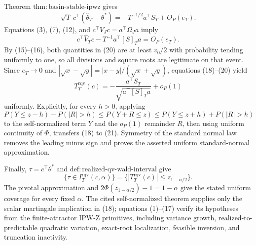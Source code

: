 Theorem \(\mathrm{thm:basin\text{-}stable\text{-}ipwz}\) gives
\[
 \sqrt T\,c^\top(\widehat\theta_T-\theta^*)
 =-T^{-1/2}a^\top S_T+O_P(e_T).
\tag{19}
\]
Equations (3), (7), (12), and \(c^\top V_Jc=a^\top\Omega_Ja\) imply
\[
 c^\top\widehat V_Tc-T^{-1}a^\top[S]_Ta=O_P(e_T).
\tag{20}
\]
By (15)--(16), both quantities in (20) are at least \(v_0/2\) with probability tending uniformly to one, so all divisions and square roots are legitimate on that event. Since \(e_T\to0\) and \(|\sqrt x-\sqrt y|=|x-y|/(\sqrt x+\sqrt y)\), equations (18)--(20) yield
\[
 T_T^{\mathrm{rqv}}(c)
 =-\frac{a^\top S_T}{\sqrt{a^\top[S]_Ta}}+o_P(1)
\tag{21}
\]
uniformly. Explicitly, for every \(h>0\), applying
\[
 P(Y\le z-h)-P(|R|>h)\le P(Y+R\le z)
 \le P(Y\le z+h)+P(|R|>h)
\]
to the self-normalized term \(Y\) and the \(o_P(1)\) remainder \(R\), then using uniform continuity of \(\Phi\), transfers (18) to (21). Symmetry of the standard normal law removes the leading minus sign and proves the asserted uniform standard-normal approximation.

Finally, \(\tau=c^\top\theta^*\) and \(\mathrm{def:realized\text{-}qv\text{-}wald\text{-}interval}\) give
\[
 \{\tau\in I_T^{\mathrm{rqv}}(c,\alpha)\}
 =\{|T_T^{\mathrm{rqv}}(c)|\le z_{1-\alpha/2}\}.
\tag{22}
\]
The pivotal approximation and \(2\Phi(z_{1-\alpha/2})-1=1-\alpha\) give the stated uniform coverage for every fixed \(\alpha\). The cited self-normalized theorem supplies only the scalar martingale implication in (18); equations (1)--(17) verify its hypotheses from the finite-attractor IPW-Z primitives, including variance growth, realized-to-predictable quadratic variation, exact-root localization, feasible inversion, and truncation inactivity.